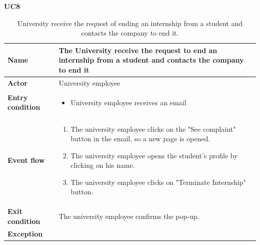     \textbf{UC8}
    \nopagebreak
    \begin{table}[H]
        \centering
        \begin{tabular}{|l|p{11.9cm}|}
        \hline
        \textbf{Name}            & The University receive the request to end an internship from a student and contacts the company to end it \\\hline
        \textbf{Actor}           & University employee     \\\hline
        \textbf{Entry condition} &
        \begin{itemize}
              \item University employee receives an email 
        \end{itemize}                                        \\\hline
        \textbf{Event flow}      &
        \begin{enumerate}[label=\arabic*.]
              \item The university employee clicks on the "See complaint" button in the email, so a new page is opened.
              \item The university employee opens the student's profile by clicking on his name.
              \item The university employee clicks on "Terminate Internship" button.
              
        \end{enumerate}            \\\hline
        \textbf{Exit condition}  & The university employee confirms the pop-up.  \\\hline
        \textbf{Exception}       &    \\\hline
        \end{tabular}
        \caption{University receive the request of ending an internship from a student and contacts the company to end it.}
        \label{table:University receive the request of ending an internship from a student and contact the company to end it}
    \end{table}

